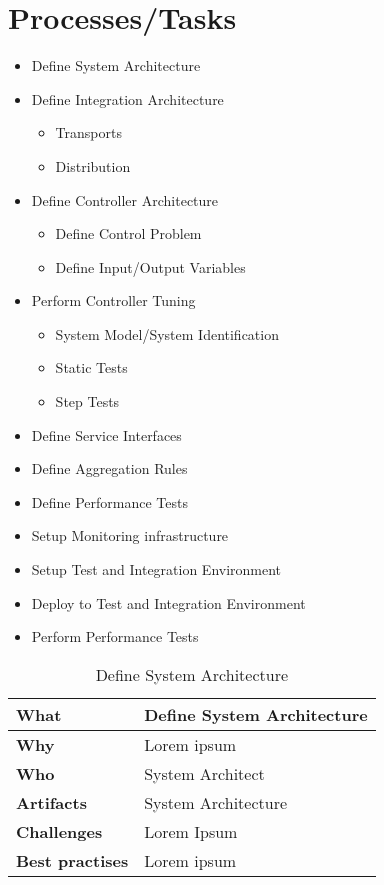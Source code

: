 \section{Processes/Tasks} 
\begin{itemize}
	\item Define System Architecture 
	\item Define Integration Architecture
	\begin{itemize}
		\item Transports
		\item Distribution
	\end{itemize}
	\item Define Controller Architecture 
	\begin{itemize}
		\item Define Control Problem 
		\item Define Input/Output Variables 
	\end{itemize}
	\item Perform Controller Tuning 
	\begin{itemize}
		\item System Model/System Identification 
		\item Static Tests
		\item Step Tests
	\end{itemize}
	\item Define Service Interfaces 
	\item Define Aggregation Rules 
	\item Define Performance Tests 
	\item Setup Monitoring infrastructure
	\item Setup Test and Integration Environment
	\item Deploy to Test and Integration Environment
	\item Perform Performance Tests
\end{itemize}
\begin{table}
	[h!] \caption{Define System Architecture} \label{table:ch6_Task_Define_System_Architect} \centering 
	\begin{tabular}
		{|m{3cm}|m{10cm}|} \hline \bfseries What & Define System Architecture\\
		\hline \bfseries Why & Lorem ipsum\\
		\hline \bfseries Who & System Architect\\
		\hline \bfseries Artifacts & System Architecture\\
		\hline \bfseries Challenges & Lorem Ipsum\\
		\hline \bfseries Best practises & Lorem ipsum\\
		\hline 
	\end{tabular}
\end{table}

